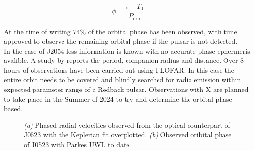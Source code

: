 \begin{equation}
    \phi = \frac{t - T_0}{P_{\text{orb}}}
    \label{eq: orbital phase}
\end{equation}

At the time of writing 74\% of the orbital phase has been observed, with time approved to observe the remaining orbital phase if the pulsar is not detected. \\

In the case of J2054 less information is known with no accurate phase ephermeris avalible. A study by \cite{karpova_new_2023} reports the period, companion radius and distance. Over 8 hours of observations have been carried out using I-LOFAR. In this case the entire orbit needs to be covered and blindly searched for radio emission within expected parameter range of a Redback pulsar. Observations with X are planned to take place in the Summer of 2024 to try and determine the orbital phase based. 

\begin{figure} %
    \centering
    \qquad
    \caption{\textit{(a)} Phased radial velocities observed from the optical counterpart of J0523 with the Keplerian fit overplotted. \textit{(b)} Observed oribital phase of J0523 with Parkes UWL to date. }%
    \label{fig: velocities}%
\end{figure}

